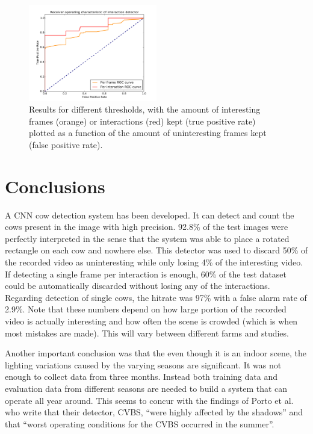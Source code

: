 \documentclass{cta-author}
\begin{document}
\begin{figure}[tb]
\begin{center}
  \includegraphics[width=0.5\textwidth]{roc.pdf}
\end{center}
  \caption{Results for different thresholds, with the amount of interesting frames (orange) or interactions
(red) kept (true positive rate) plotted as a function of the amount of uninteresting frames kept (false
positive rate).}
  \label{fig:roc}
\end{figure}


\section{Conclusions}
A CNN cow detection system has been developed. It can detect and count the cows present in the image with
high precision. 92.8\% of the test images were perfectly interpreted in the sense that the system was able
to place a rotated rectangle on each cow and nowhere else. This detector was used to discard 50\% of the
recorded video as uninteresting while only losing 4\% of the interesting video. If detecting a single frame
per interaction is enough, 60\% of the test dataset could be automatically discarded without losing any of the
interactions. Regarding detection of single cows, the hitrate was 97\% with a false alarm rate of 2.9\%.
Note that these numbers depend on how large portion of the recorded video is actually interesting and how
often the scene is crowded (which is when most mistakes are made). This will vary between different farms and
studies.

Another important conclusion was that the even though it is an indoor scene, the lighting variations caused
by the varying seasons are significant. It was not enough to collect data from three months. Instead both
training data and evaluation data from different seasons are needed to build a system that can operate all
year around. This seems to concur with the findings of Porto et al. \cite{porto2015automatic} who write that
their detector, CVBS,
``were highly affected by the shadows'' and that ``worst operating
conditions for the CVBS occurred in the summer''.
\end{document}
